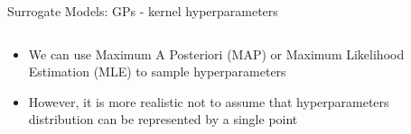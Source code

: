 \begin{frame}[c]{Surrogate Models: GPs - kernel hyperparameters}

\begin{columns}[T] %
\begin{column}{.58\textwidth}
\begin{itemize}
    \item We can use Maximum A Posteriori (MAP) or Maximum Likelihood Estimation (MLE) to sample hyperparameters 
    \item However, it is more realistic not to assume that hyperparameters distribution can be represented by a single point
\end{itemize}
\end{column}%

\hfill%

\begin{column}{.38\textwidth}
\end{column}%
\end{columns}

\end{frame}

